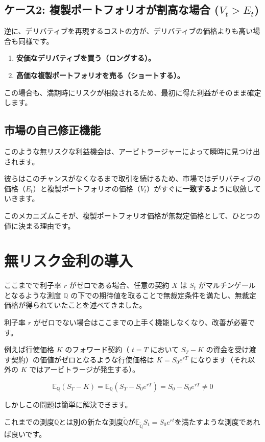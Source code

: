 \documentclass[uplatex,a4j,12pt,dvipdfmx]{jsarticle}
\begin{document}
\subsection{ケース2: 複製ポートフォリオが割高な場合 ($V_t > E_t$)}
逆に、デリバティブを再現するコストの方が、デリバティブの価格よりも高い場合も同様です。
\begin{enumerate}
	\item \textbf{安価なデリバティブを買う（ロングする）。}
	\item \textbf{高価な複製ポートフォリオを売る（ショートする）。}
\end{enumerate}
この場合も、満期時にリスクが相殺されるため、最初に得た利益がそのまま確定します。

\subsection{市場の自己修正機能}
このような無リスクな利益機会は、アービトラージャーによって瞬時に見つけ出されます。

彼らはこのチャンスがなくなるまで取引を続けるため、市場ではデリバティブの価格（$E_t$）と複製ポートフォリオの価格（$V_t$）がすぐに\textbf{一致する}ように収斂していきます。

このメカニズムこそが、複製ポートフォリオ価格が無裁定価格として、ひとつの値に決まる理由です。

\section{無リスク金利の導入}
ここまでで利子率 $r$ がゼロである場合、任意の契約 $X$ は $S_{t}$ がマルチンゲールとなるような測度 $\mathbb{Q}$ の下での期待値を取ることで無裁定条件を満たし、無裁定価格が得られていたことを述べてきました。

利子率 $r$ がゼロでない場合はここまでの上手く機能しなくなり、改善が必要です。

例えば行使価格 $K$ のフォワード契約（ $t=T$ において $S_{T}-K$ の資金を受け渡す契約）の価値がゼロとなるような行使価格は $K=S_{0} e^{rT}$ になります（それ以外の $K$ ではアービトラージが発生する）。

$$ \mathbb{E}_{\mathbb{Q}}(S_{T} - K) = \mathbb{E}_{\mathbb{Q}}(S_{T} - S_{0} e^{rT}) = S_{0} - S_{0} e^{rT} \neq 0 $$

しかしこの問題は簡単に解決できます。

これまでの測度$\mathbb{Q}$とは別の新たな測度$\mathbb{\tilde Q}$が$\mathbb{E}_{\mathbb{\tilde Q}}S_{t} = S_{0} e^{rt}$を満たすような測度であれば良いです。
\end{document}
